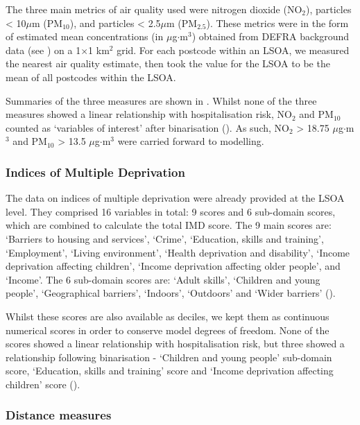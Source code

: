 The three main metrics of air quality used were nitrogen dioxide (NO$_2$), particles < 10$\mu$m (PM$_{10}$), and particles < 2.5$\mu$m (PM$_{2.5}$). These metrics were in the form of estimated mean concentrations (in $\mu$g$\cdot$m$^3$) obtained from DEFRA background data (see ) on a 1$\times$1 km$^2$ grid. 
For each postcode within an LSOA, we measured the nearest air quality estimate, then took the value for the LSOA to be the mean of all postcodes within the LSOA.

Summaries of the three measures are shown in . Whilst none of the three measures showed a linear relationship with hospitalisation risk, NO$_2$ and PM$_{10}$ counted as `variables of interest' after binarisation (). As such, NO$_2$ > 18.75 $\mu$g$\cdot$m$^3$ and PM$_{10}$ > 13.5 $\mu$g$\cdot$m$^3$ were carried forward to modelling.

\subsubsection{Indices of Multiple Deprivation}

The data on indices of multiple deprivation were already provided at the LSOA level. They comprised 16 variables in total: 9 scores and 6 sub-domain scores, which are combined to calculate the total IMD score. The 9 main scores are: `Barriers to housing and services', `Crime', `Education, skills and training', `Employment', `Living environment', `Health deprivation and disability', `Income deprivation affecting children', `Income deprivation affecting older people', and `Income'. The 6 sub-domain scores are: `Adult skills', `Children and young people', `Geographical barriers', `Indoors', `Outdoors' and `Wider barriers' ().

Whilst these scores are also available as deciles, we kept them as continuous numerical scores in order to conserve model degrees of freedom. None of the scores showed a linear relationship with hospitalisation risk, but three showed a relationship following binarisation - `Children and young people' sub-domain score, `Education, skills and training' score and `Income deprivation affecting children' score ().

\subsubsection{Distance measures}

